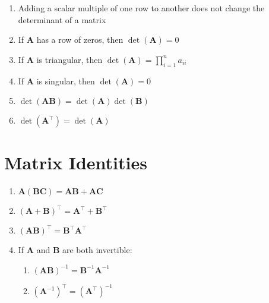 \documentclass{article}
\begin{document}
\begin{multicols*}{2}
\begin{enumerate}
        \item Adding a scalar multiple of one row to another does not change the determinant of a matrix
        \item If \(\symbf{A}\) has a row of zeros, then \(\det{\left( \symbf{A} \right)}=0\)
        \item If \(\symbf{A}\) is triangular, then \(\det{\left( \symbf{A} \right)}=\prod_{i=1}^{n} a_{ii}\)
        \item If \(\symbf{A}\) is singular, then \(\det{\left( \symbf{A} \right)}=0\)
        \item \(\det{\left( \symbf{A}\symbf{B} \right)} = \det{\left( \symbf{A} \right)}\det{\left( \symbf{B} \right)}\)
        \item \(\det{\left( \symbf{A}^\top \right)} = \det{\left( \symbf{A} \right)}\)
    \end{enumerate}
    \section*{Matrix Identities}
    \begin{enumerate}
        \item \(\symbf{A}\left( \symbf{B}\symbf{C} \right) = \symbf{A}\symbf{B}+\symbf{A}\symbf{C}\)
        \item \(\left( \symbf{A}+\symbf{B} \right)^\top = \symbf{A}^\top + \symbf{B}^\top\)
        \item \(\left( \symbf{A}\symbf{B} \right)^\top = \symbf{B}^\top \symbf{A}^\top\)
        \item If \(\symbf{A}\) and \(\symbf{B}\) are both invertible:
              \begin{enumerate}
                  \item \(\left( \symbf{A}\symbf{B} \right)^{-1} = \symbf{B}^{-1}\symbf{A}^{-1}\)
                  \item \(\left( \symbf{A}^{-1} \right)^\top = \left( \symbf{A}^\top \right)^{-1}\)
              \end{enumerate}
    \end{enumerate}
\end{multicols*}
\end{document}
